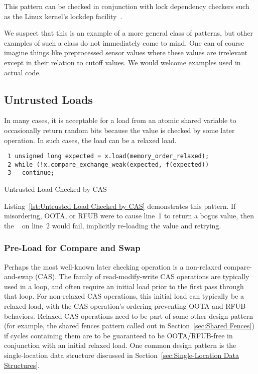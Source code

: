 \documentclass[10]{article}
\begin{document}
This pattern can be checked in conjunction with lock dependency checkers
such as the Linux kernel's lockdep facility~\cite{JonathanCorbet2006lockdep}.

We suspect that this is an example of a more general class of patterns,
but other examples of such a class do not immediately come to mind.
One can of course imagine things like preprocessed sensor values where
these values are irrelevant except in their relation to cutoff values.
We would welcome examples used in actual code.

\subsection{Untrusted Loads}
\label{sec:Untrusted Loads}

In many cases, it is acceptable for a load from an atomic shared variable
to occasionally return random bits because the value is checked by
some later operation.
In such cases, the load can be a relaxed load.

\begin{listing}[tbp]
\begin{verbatim}
 1 unsigned long expected = x.load(memory_order_relaxed);
 2 while (!x.compare_exchange_weak(expected, f(expected))
 3   continue;
\end{verbatim}
\caption{Untrusted Load Checked by CAS}
\label{lst:Untrusted Load Checked by CAS}
\end{listing}

Listing~\ref{lst:Untrusted Load Checked by CAS}
demonstrates this pattern.
If misordering, OOTA, or RFUB were to cause line~1 to return a bogus
value, then the ~ on line~2 would fail,
implicitly re-loading the value and retrying.

\subsubsection{Pre-Load for Compare and Swap}
\label{sec:Pre-Load for Compare and Swap}

Perhaps the most well-known later checking operation is a non-relaxed
compare-and-swap (CAS).
The  family of read-modify-write
CAS operations are typically used in a loop, and often require an initial
load prior to the first pass through that loop.
For non-relaxed CAS operations, this initial load can typically be a
relaxed load, with the CAS operation's ordering preventing OOTA and RFUB
behaviors.
Relaxed CAS operations need to be part of some other design pattern
(for example, the shared fences pattern called out in
Section~\ref{sec:Shared Fences})
if cycles containing them are to be guaranteed to be OOTA/RFUB-free in
conjunction with an initial relaxed load.
One common design pattern is the single-location data structure discussed in
Section~\ref{sec:Single-Location Data Structures}.
\end{document}
